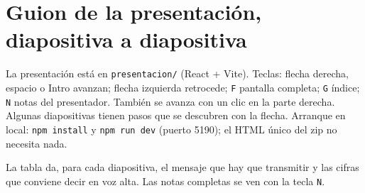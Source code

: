 \documentclass[11pt,a4paper]{article}
\newcommand{\cod}[1]{\texttt{#1}}
\begin{document}
\section{Guion de la presentación, diapositiva a diapositiva}\label{sec:guion}

La presentación está en \cod{presentacion/} (React + Vite). Teclas: flecha derecha, espacio o Intro avanzan; flecha izquierda retrocede; \texttt{F} pantalla completa; \texttt{G} índice; \texttt{N} notas del presentador. También se avanza con un clic en la parte derecha. Algunas diapositivas tienen pasos que se descubren con la flecha. Arranque en local: \cod{npm install} y \cod{npm run dev} (puerto 5190); el HTML único del zip no necesita nada.

La tabla da, para cada diapositiva, el mensaje que hay que transmitir y las cifras que conviene decir en voz alta. Las notas completas se ven con la tecla \texttt{N}.
\end{document}
